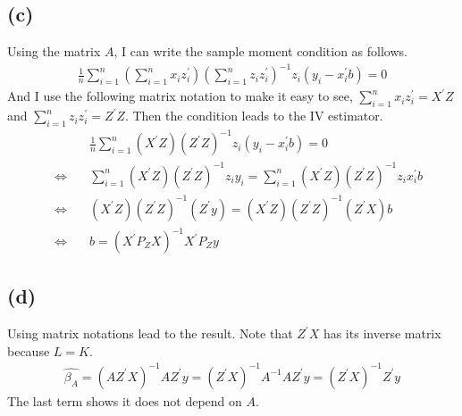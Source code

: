 \documentclass{article}
\begin{document}
\subsection{(c)}
Using the matrix $A$, I can write the sample moment condition as follows.
\begin{align*}
	\frac{1}{n}\sum_{i = 1}^n \left(\sum_{i = 1}^n x_i z_i^{'}\right)\left(\sum_{i = 1}^n z_i z_i^{'}\right)^{-1} z_i (y_i - x_i^{'}b) = 0
\end{align*}
And I use the following matrix notation to make it easy to see, $\sum_{i = 1}^n x_i z_i^{'} = X^{'}Z$ and $\sum_{i = 1}^n z_i z_i^{'} = Z^{'}Z$. Then the condition leads to the IV estimator.
\begin{align*}
	&\frac{1}{n}\sum_{i = 1}^n \left(X^{'}Z\right)\left(Z^{'}Z\right)^{-1} z_i (y_i - x_i^{'}b) = 0\\[8pt]
	\quad \Leftrightarrow \quad&\sum_{i=1}^n \left(X^{'}Z\right)\left(Z^{'}Z\right)^{-1} z_i y_i = \sum_{i=1}^n \left(X^{'}Z\right)\left(Z^{'}Z\right)^{-1}z_i x_i^{'}b\\[8pt]
	\quad \Leftrightarrow \quad& \left(X^{'}Z\right)\left(Z^{'}Z\right)^{-1}\left(Z^{'}y\right) = \left(X^{'}Z\right)\left(Z^{'}Z\right)^{-1}\left(Z^{'}X\right)b\\[8pt]
	\quad \Leftrightarrow \quad&b = (X^{'}P_ZX)^{-1}X^{'}P_Z y
\end{align*}

\subsection{(d)}
Using matrix notations lead to the result. Note that $Z^{'}X$ has its inverse matrix because $L = K$.
\begin{align*}
	\hat{\beta_A} = (AZ^{'}X)^{-1}AZ^{'}y = (Z^{'}X)^{-1}A^{-1}AZ^{'}y = (Z^{'}X)^{-1}Z^{'}y
\end{align*}
The last term shows it does not depend on $A$.
\end{document}
